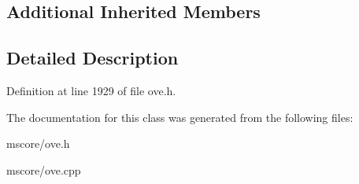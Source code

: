 \subsection*{Additional Inherited Members}


\subsection{Detailed Description}


Definition at line 1929 of file ove.\+h.



The documentation for this class was generated from the following files\+:\begin{DoxyCompactItemize}
\item 
mscore/ove.\+h\item 
mscore/ove.\+cpp\end{DoxyCompactItemize}
